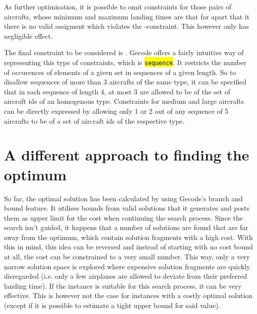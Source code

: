 \documentclass[,%
			paper=a4,%
			DIV12,
			liststotoc,
			bibtotoc,
			draft=false,%
			numbers=noendperiod
			]{scrartcl}
\newcommand{\ilc}[1]{\hl{\texttt{#1}}}
\newcommand{\mymarginnote}[1]{\marginnote{\footnotesize{#1}}}
\begin{document}
As further optimisation, it is possible to omit constraints for those pairs of aircrafts, whose minimum and maximum landing times are that far apart that it there is no valid assigment which violates the \CseqDel-constraint. This however only has negligible effect.

\mymarginnote{\CtypeSeq}
The final constraint to be considered is \CtypeSeq.
Gecode offers a fairly intuitive way of representing this type of constraints, which is \ilc{sequence}.
It restricts the number of occurences of elements of a given set in sequences of a given length.
So to disallow sequences of more than 3 aircrafts of the same type, it can be specified that in each sequence of length 4, at most 3 are allowed to be of the set of aircraft ids of an homogenous type.
Constraints for medium and large aircrafts can be directly expressed by allowing only 1 or 2 out of any sequence of 5 aircrafts to be of a set of aircraft ids of the respective type.



\section{A different approach to finding the optimum}
So far, the optimal solution has been calculated by using Gecode's branch and bound feature.
It utilises bounds from valid solutions that it generates and posts them as upper limit for the cost when continuing the search process.
Since the search isn't guided, it happens that a number of solutions are found that are far away from the optimum, which contain solution fragments with a high cost. 
With this in mind, this idea can be reversed and instead of starting with no cost bound at all, the cost can be constrained to a very small number.
This way, only a very narrow solution space is explored where expensive solution fragments are quickly disregarded (i.e. only a few airplanes are allowed to deviate from their preferred landing time).
If the instance is suitable for this search process, it can be very effective.
This is however not the case for instances with a costly optimal solution (except if it is possible to estimate a tight upper bound for said value).
\end{document}
